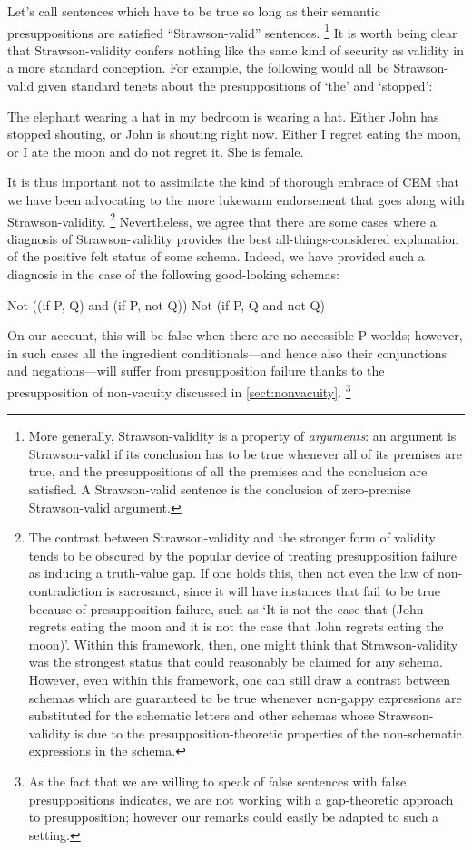 \documentclass[leqno, 11pt, a5paper, openany]{article}
\begin{document}
Let's call sentences which have to be true so long as their semantic presuppositions are satisfied “Strawson-valid” sentences.%
\footnote{More generally, Strawson-validity is a property of \emph{arguments}: an argument is Strawson-valid if its conclusion has to be true whenever all of its premises are true, and the presuppositions of all the premises and the conclusion are satisfied.  A Strawson-valid sentence is the conclusion of zero-premise Strawson-valid argument.}
It is worth being clear that Strawson-validity confers nothing like the same kind of security as validity in a more standard conception.  For example, the following would all be Strawson-valid given standard tenets about the presuppositions of ‘the’ and ‘stopped’:
\begin{prop}
	\nitem
	The elephant wearing a hat in my bedroom is wearing a hat.
	\nitem
	Either John has stopped shouting, or John is shouting right now.
	\nitem
	Either I regret eating the moon, or I ate the moon and do not regret it.  
	\nitem
	She is female.
\end{prop}
It is thus important not to assimilate the kind of thorough embrace of CEM that we have been advocating to the more lukewarm endorsement that goes along with Strawson-validity.%
\footnote{The contrast between Strawson-validity and the stronger form of validity tends to be obscured by the popular device of treating presupposition failure as inducing a truth-value gap.  If one holds this, then not even the law of non-contradiction is sacrosanct, since it will have instances that fail to be true because of presupposition-failure, such as ‘It is not the case that (John regrets eating the moon and it is not the case that John regrets eating the moon)’.  Within this framework, then, one might think that Strawson-validity was the strongest status that could reasonably be claimed for any schema.  However, even within this framework, one can still draw a contrast between schemas which are guaranteed to be true whenever non-gappy expressions are substituted for the schematic letters and other schemas whose Strawson-validity is due to the presupposition-theoretic properties of the non-schematic expressions in the schema.}
Nevertheless, we agree that there are some cases where a diagnosis of Strawson-validity provides the best all-things-considered explanation of the positive felt status of some schema.  Indeed, we have provided such a diagnosis in the case of the following good-looking schemas:
\begin{prop}
	\sitem[CNC]
	Not ((if P, Q) and (if P, not Q))
	\sitem[CNC*]
	Not (if P, Q and not Q)
\end{prop}
On our account, this will be false when there are no accessible P-worlds; however, in such cases all the ingredient conditionals---and hence also their conjunctions and negations---will suffer from presupposition failure thanks to the presupposition of non-vacuity discussed in \autoref{sect:nonvacuity}.%
\footnote{As the fact that we are willing to speak of false sentences with false presuppositions indicates, we are not working with a gap-theoretic approach to presupposition; however our remarks could easily be adapted to such a setting.}  
\end{document}
